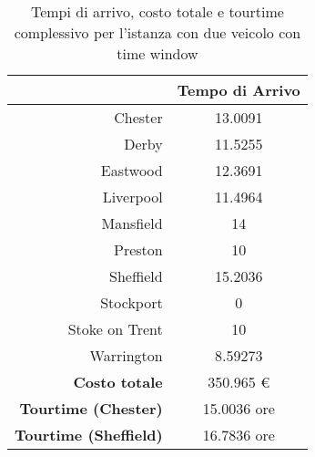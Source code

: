 
		\begin{table}[H]
			\small
			\centering
			\begin{tabular}{rc}

				\toprule
				& Tempo di Arrivo \\

				\midrule
				Chester & 13.0091 \\
				Derby  & 11.5255 \\
				Eastwood & 12.3691 \\
				Liverpool  & 11.4964 \\
				Mansfield & 14 \\
				Preston & 10 \\
				Sheffield & 15.2036 \\
				Stockport & 0 \\
				Stoke on Trent & 10 \\
				Warrington & 8.59273 \\

				\midrule
				\textbf{Costo totale} & 350.965 € \\
				\textbf{Tourtime (Chester)} & 15.0036 ore \\
				\textbf{Tourtime (Sheffield)} & 16.7836 ore \\
				\bottomrule
			\end{tabular}
			\label{table:instance_4_totale}
			\caption{Tempi di arrivo, costo totale e tourtime complessivo per l'istanza con due veicolo con time window}
		\end{table}

